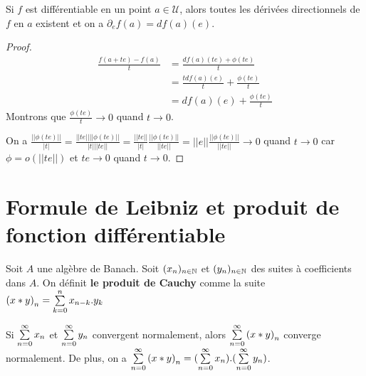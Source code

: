 \begin{proposition}
	Si $f$ est différentiable en un point $a \in \mathcal{U}$, alors toutes les
	dérivées directionnels de $f$ en $a$ existent et on a $\partial_{e}f(a) =
	df(a)(e)$.
\end{proposition}

\begin{proof}
\begin{align}
	\displaystyle \frac{f(a + te) - f(a)}{t} 
	&= \frac{df(a)(te) + \phi(te)}{t}\\
	&= \frac{t df(a)(e)}{t} + \frac{\phi(te)}{t} \\
	&= df(a)(e) + \frac{\phi(te)}{t}
\end{align}
	Montrons que $\displaystyle \frac{\phi(te)}{t} \rightarrow 0$ quand $t
	\rightarrow 0$.

	On a $\displaystyle \frac{||\phi(te)||}{|t|} = \frac{||te||
	||\phi(te)||}{|t| ||te||} = \frac{||te||}{|t|}
	\frac{||\phi(te)||}{||te||} = ||e|| \frac{||\phi(te)||}{||te||} \rightarrow
	0$ quand $t \rightarrow 0$ car $\phi = o(||te||)$ et $te \rightarrow 0$
	quand $t \rightarrow 0$.
\end{proof}

\begin{definition}
\label{partial_application_definition}
	

\end{definition}

\section{Formule de Leibniz et produit de fonction différentiable}

\begin{definition}
	Soit $A$ une algèbre de Banach. Soit $(x_{n})_{n \in \mathbb{N}}$ et
	$(y_{n})_{n \in \mathbb{N}}$ des suites à coefficients dans $A$.
	On définit \textbf{le produit de Cauchy} comme la suite ${(x \ast y)}_{n} =
	\sum\limits_{k = 0}^{n} x_{n - k} . y_{k}$
\end{definition}

\begin{theorem}
\label{theorem_cauchy_mertens}
Si $\sum\limits_{n = 0}^{\infty} x_{n}$ et $\sum\limits_{n = 0}^{\infty} y_{n}$ convergent
normalement, alors $\sum\limits_{n = 0}^{\infty} {(x \ast y)}_{n}$ converge normalement.
De plus, on a $\sum\limits_{n = 0}^{\infty} {(x \ast y)}_{n} = 
(\sum\limits_{n = 0}^{\infty} x_{n}) . (\sum\limits_{n = 0}^{\infty} y_{n})$.
\end{theorem}

